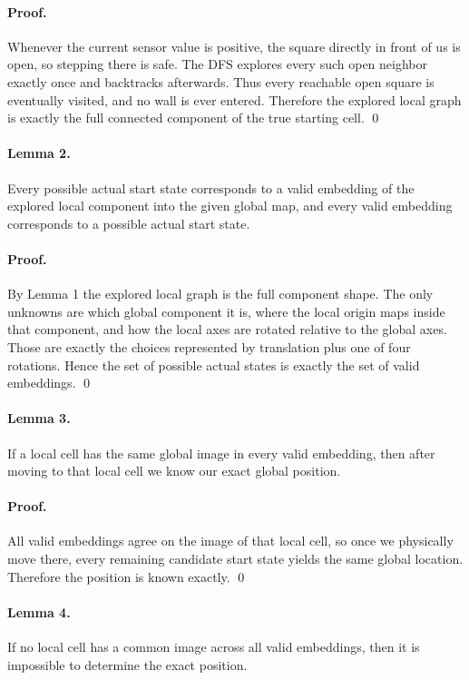 \documentclass[11pt]{article}
\begin{document}
\paragraph{Proof.}
Whenever the current sensor value is positive, the square directly in front of us is open, so stepping there is safe. The DFS explores every such open neighbor exactly once and backtracks afterwards. Thus every reachable open square is eventually visited, and no wall is ever entered. Therefore the explored local graph is exactly the full connected component of the true starting cell. \qed

\paragraph{Lemma 2.}
Every possible actual start state corresponds to a valid embedding of the explored local component into the given global map, and every valid embedding corresponds to a possible actual start state.

\paragraph{Proof.}
By Lemma 1 the explored local graph is the full component shape. The only unknowns are which global component it is, where the local origin maps inside that component, and how the local axes are rotated relative to the global axes. Those are exactly the choices represented by translation plus one of four rotations. Hence the set of possible actual states is exactly the set of valid embeddings. \qed

\paragraph{Lemma 3.}
If a local cell has the same global image in every valid embedding, then after moving to that local cell we know our exact global position.

\paragraph{Proof.}
All valid embeddings agree on the image of that local cell, so once we physically move there, every remaining candidate start state yields the same global location. Therefore the position is known exactly. \qed

\paragraph{Lemma 4.}
If no local cell has a common image across all valid embeddings, then it is impossible to determine the exact position.
\end{document}
